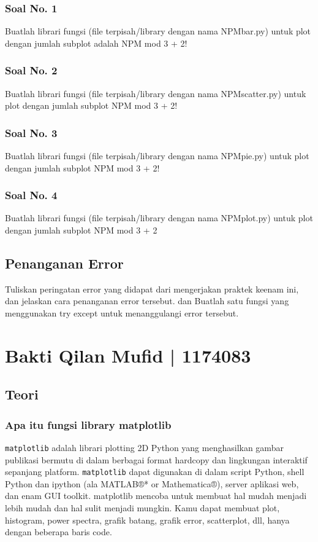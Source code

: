 \subsubsection{Soal No. 1}
\hfill \break
Buatlah librari fungsi (file terpisah/library dengan nama NPMbar.py) untuk plot dengan jumlah subplot adalah NPM mod 3 + 2!

\subsubsection{Soal No. 2}
\hfill \break
Buatlah librari fungsi (file terpisah/library dengan nama NPMscatter.py) untuk plot dengan jumlah subplot NPM mod 3 + 2!

\subsubsection{Soal No. 3}
\hfill \break
Buatlah librari fungsi (file terpisah/library dengan nama NPMpie.py) untuk plot dengan jumlah subplot NPM mod 3 + 2!

\subsubsection{Soal No. 4}
\hfill \break
Buatlah librari fungsi (file terpisah/library dengan nama NPMplot.py) untuk plot dengan jumlah subplot NPM mod 3 + 2


\subsection{Penanganan Error}
Tuliskan  peringatan  error  yang  didapat  dari  mengerjakan  praktek  keenam  ini, dan  jelaskan  cara  penanganan  error  tersebut. dan  Buatlah  satu  fungsi  yang menggunakan try except untuk menanggulangi error tersebut.
\section{Bakti Qilan Mufid | 1174083}
\subsection{Teori}
\subsubsection{Apa itu fungsi library matplotlib}
\hfill \break
\verb|matplotlib| adalah librari plotting 2D Python yang menghasilkan gambar publikasi bermutu di dalam berbagai format hardcopy dan lingkungan interaktif sepanjang platform. \verb|matplotlib| dapat digunakan di dalam script Python, shell Python dan ipython (ala MATLAB®* or Mathematica®), server aplikasi web, dan enam GUI toolkit. matplotlib mencoba untuk membuat hal mudah menjadi lebih mudah dan hal sulit menjadi mungkin. Kamu dapat membuat plot, histogram, power spectra, grafik batang, grafik error, scatterplot, dll, hanya dengan beberapa baris code.

